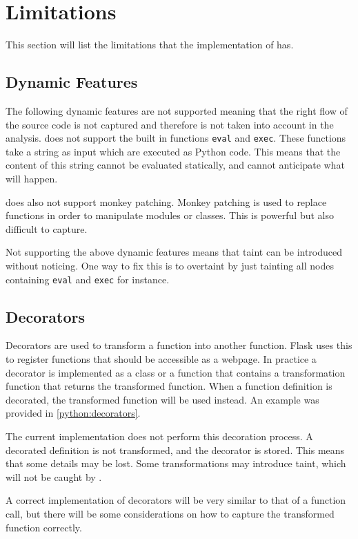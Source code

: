 \section{Limitations}
This section will list the limitations that the implementation of \pyt{} has.

\subsection{Dynamic Features}
The following dynamic features are not supported meaning that the right flow of the source code is not captured and therefore is not taken into account in the analysis.
\pyt{} does not support the built in functions \texttt{eval} and \texttt{exec}.
These functions take a string as input which are executed as Python code.
This means that the content of this string cannot be evaluated statically, and \pyt{} cannot anticipate what will happen.

\pyt{} does also not support monkey patching.
Monkey patching is used to replace functions in order to manipulate modules or classes.
This is powerful but also difficult to capture.

Not supporting the above dynamic features means that taint can be introduced without \pyt{} noticing.
One way to fix this is to overtaint by just tainting all nodes containing \texttt{eval} and \texttt{exec} for instance.

\subsection{Decorators}
Decorators are used to transform a function into another function.
Flask uses this to register functions that should be accessible as a webpage.
In practice a decorator is implemented as a class or a function that contains a transformation function that returns the transformed function.
When a function definition is decorated, the transformed function will be used instead.
An example was provided in \cref{python:decorators}.

The current implementation does not perform this decoration process.
A decorated definition is not transformed, and the decorator is stored.
This means that some details may be lost.
Some transformations may introduce taint, which will not be caught by \pyt{}.

A correct implementation of decorators will be very similar to that of a function call, but there will be some considerations on how to capture the transformed function correctly.

